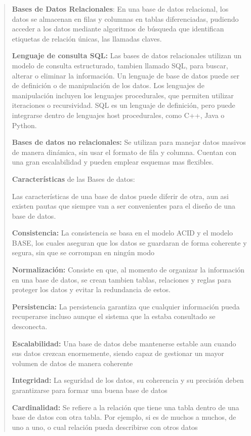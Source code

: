 \documentclass[14pt]{extarticle}
\begin{document}
\begin{quote}
\textbf{Bases de Datos Relacionales}: En una base de datos relacional,
los datos se almacenan en filas y columnas en tablas diferenciadas,
pudiendo acceder a los datos mediante algoritmos de búsqueda que
identifican etiquetas de relación únicas, las llamadas claves.

\textbf{Lenguaje de consulta SQL:} Las bases de datos relacionales
utilizan un modelo de consulta estructurado, tambien llamado SQL, para
buscar, alterar o eliminar la información. Un lenguaje de base de datos
puede ser de definición o de manipulación de los datos. Los lenguajes de
manipulación incluyen los lenguajes procedurales, que permiten utilizar
iteraciones o recursividad. SQL es un lenguaje de definición, pero puede
integrarse dentro de lenguajes host procedurales, como C++, Java o
Python.

\textbf{Bases de datos no relacionales:} Se utilizan para manejar datos
masivos de manera dinámica, sin usar el formato de fila y columna.
Cuentan con una gran escalabilidad y pueden emplear esquemas mas
flexibles.

\textbf{Características} de las Bases de datos:

Las características de una base de datos puede diferir de otra, aun asi
existen pautas que siempre van a ser convenientes para el diseño de una
base de datos.

\textbf{Consistencia:} La consistencia se basa en el modelo ACID y el
modelo BASE, los cuales aseguran que los datos se guardaran de forma
coherente y segura, sin que se corrompan en ningún modo

\textbf{Normalización:} Consiste en que, al momento de organizar la
información en una base de datos, se crean tambien tablas, relaciones y
reglas para proteger los datos y evitar la redundancia de estos.

\textbf{Persistencia:} La persistencia garantiza que cualquier
información pueda recuperarse incluso aunque el sistema que la estaba
consultado se desconecta.

\textbf{Escalabilidad:} Una base de datos debe mantenerse estable aun
cuando sus datos crezcan enormemente, siendo capaz de gestionar un mayor
volumen de datos de manera coherente

\textbf{Integridad:} La seguridad de los datos, su coherencia y su
precisión deben garantizarse para formar una buena base de datos

\textbf{Cardinalidad:} Se refiere a la relación que tiene una tabla
dentro de una base de datos con otra tabla. Por ejemplo, si es de muchos
a muchos, de uno a uno, o cual relación pueda describirse con otros
datos
\end{quote}
\end{document}
